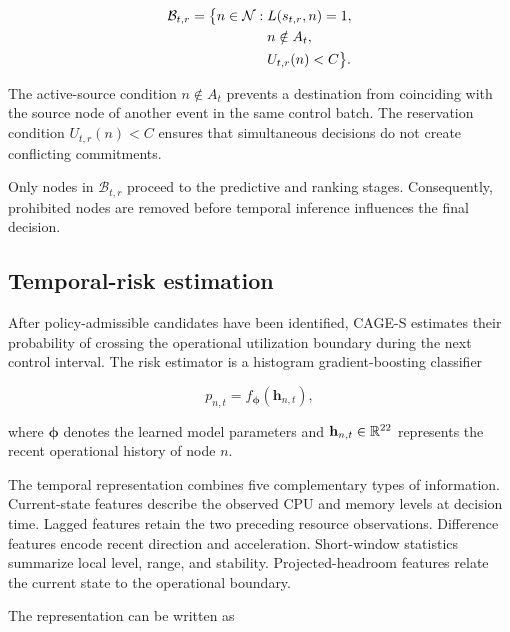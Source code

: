 \begin{equation}
\label{eq:base-candidate-method}
\begin{split}
    \mathcal{B}_{t,r}
    =
    \big\{
        n\in\mathcal{N}:
        &\;L(s_{t,r},n)=1,\\
        &\;n\notin A_t,\\
        &\;U_{t,r}(n)<C
    \big\}.
\end{split}
\end{equation}

The active-source condition $n\notin A_t$ prevents a destination from
coinciding with the source node of another event in the same control
batch. The reservation condition $U_{t,r}(n)<C$ ensures that simultaneous
decisions do not create conflicting commitments.

Only nodes in $\mathcal{B}_{t,r}$ proceed to the predictive and ranking
stages. Consequently, prohibited nodes are removed before temporal
inference influences the final decision.

\subsection{Temporal-risk estimation}

After policy-admissible candidates have been identified, CAGE-S estimates
their probability of crossing the operational utilization boundary during
the next control interval. The risk estimator is a histogram
gradient-boosting classifier

\begin{equation}
\label{eq:method-risk-model}
    p_{n,t}
    =
    f_{\boldsymbol{\phi}}
    \left(
        \mathbf{h}_{n,t}
    \right),
\end{equation}

where $\boldsymbol{\phi}$ denotes the learned model parameters and
$\mathbf{h}_{n,t}\in\mathbb{R}^{22}$ represents the recent operational history of
node $n$.

The temporal representation combines five complementary types of
information. Current-state features describe the observed CPU and memory
levels at decision time. Lagged features retain the two preceding
resource observations. Difference features encode recent direction and
acceleration. Short-window statistics summarize local level, range, and
stability. Projected-headroom features relate the current state to the
operational boundary.

The representation can be written as

